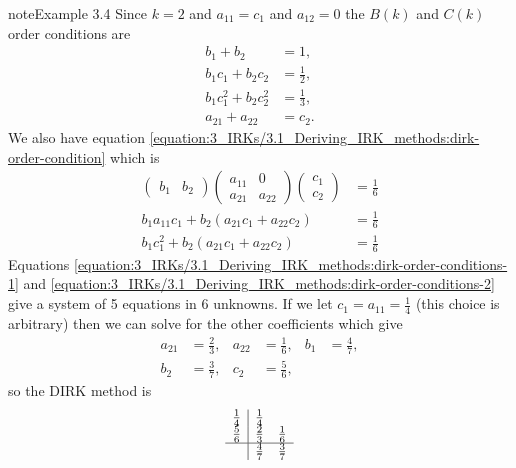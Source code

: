 \documentclass[letterpaper,10pt,english]{jupyterBook}
\begin{document}
\begin{sphinxadmonition}{note}{Example 3.4}
\sphinxAtStartPar
Since \(k = 2\) and \(a_{11} = c_1\) and \(a_{12} = 0\) the \(B(k)\) and \(C(k)\) order conditions are
\begin{equation}\label{equation:3_IRKs/3.1_Deriving_IRK_methods:dirk-order-conditions-1}
\begin{split}b_1 + b_2  & = 1,\\
b_1 c_1 + b_2 c_2  & = \frac{1}{2},\\
b_1 c_1^2 + b_2 c_2^2  & = \frac{1}{3},\\
a_{21} + a_{22}  & = c_2.\end{split}
\end{equation}
\sphinxAtStartPar
We also have equation \eqref{equation:3_IRKs/3.1_Deriving_IRK_methods:dirk-order-condition} which is
\begin{equation}\label{equation:3_IRKs/3.1_Deriving_IRK_methods:dirk-order-conditions-2}
\begin{split}\begin{pmatrix} b_1 & b_2 \end{pmatrix}
\begin{pmatrix} a_{11} & 0 \\ a_{21} & a_{22} \end{pmatrix} 
\begin{pmatrix} c_1 \\ c_2 \end{pmatrix} &= \frac{1}{6} \\
b_1 a_{11} c_1 + b_2(a_{21} c_1 + a_{22} c_2)  &= \frac{1}{6} \\
b_1 c_1^2 + b_2(a_{21} c_1 + a_{22} c_2) &= \frac{1}{6}\end{split}
\end{equation}
\sphinxAtStartPar
Equations \eqref{equation:3_IRKs/3.1_Deriving_IRK_methods:dirk-order-conditions-1} and \eqref{equation:3_IRKs/3.1_Deriving_IRK_methods:dirk-order-conditions-2} give a system of 5 equations in 6 unknowns. If we let \(c_1 = a_{11} = \frac{1}{4}\) (this choice is arbitrary) then we can solve for the other coefficients which give
\begin{align*}
  a_{21} &= \frac{2}{3}, &
  a_{22} &= \frac{1}{6}, &
  b_1 &= \frac{4}{7}, \\
  b_2 &= \frac{3}{7}, &
  c_2 &= \frac{5}{6},
\end{align*}
\sphinxAtStartPar
so the DIRK method is
\begin{align*}
  \begin{array}{c|cc}
        \frac{1}{4} & \frac{1}{4} \\
        \frac{5}{6} & \frac{2}{3} & \frac{1}{6} \\ \hline
        & \frac{4}{7} & \frac{3}{7}
  \end{array}
\end{align*}\end{sphinxadmonition}
\end{document}
